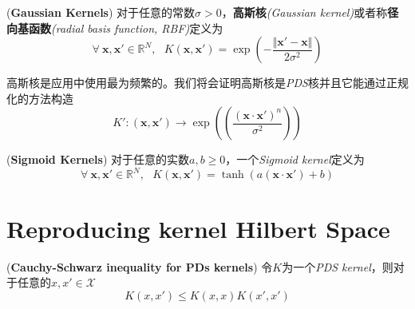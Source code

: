 \begin{example}
    (\textbf{Gaussian Kernels})\hspace*{0.5em} 对于任意的常数$\sigma>0$，\textbf{高斯核}\textsl{(Gaussian kernel)}或者称\textbf{径向基函数}\textsl{(radial basis function, RBF)}定义为
    \begin{equation}
        \forall\ \mathbf{x},\mathbf{x}'\in \mathbb{R}^N,\ \ \ K(\mathbf{x},\mathbf{x}')=\exp\left(-\frac{\Vert \mathbf{x}'-\mathbf{x}\Vert}{2\sigma^2}\right)
    \end{equation}

    高斯核是应用中使用最为频繁的。我们将会证明高斯核是\textsl{PDS}核并且它能通过正规化的方法构造
    \begin{equation}
        K':(\mathbf{x},\mathbf{x}')\rightarrow \exp((\frac{(\mathbf{x}\cdot \mathbf{x}')^n}{\sigma^2}))
    \end{equation}
\end{example}
\begin{example}
    (\textbf{Sigmoid Kernels})\hspace*{0.5em} 对于任意的实数$a,b\geqslant 0$，一个\textsl{Sigmoid kernel}定义为
    \begin{equation}
        \forall\ \mathbf{x},\mathbf{x}'\in \mathbb{R}^N,\ \ \ K(\mathbf{x},\mathbf{x}')=\tanh\left(a(\mathbf{x}\cdot \mathbf{x}')+b\right)
    \end{equation}
\end{example}

\section{Reproducing kernel Hilbert Space}

\begin{mdframed}
  \begin{lemma}
    (\textbf{Cauchy-Schwarz inequality for PDs kernels})\hspace{0.5em} 令$K$为一个\textsl{PDS kernel}，则对于任意的$x,x'\in \mathcal{X}$
    \begin{equation}
        K(x,x')\leqslant K(x,x)K(x',x')
    \end{equation}
  \end{lemma}  
\end{mdframed}


